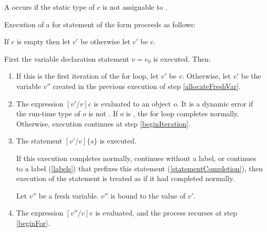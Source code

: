 \documentclass[makeidx]{article}
\begin{document}
{\LMHash{}%
A  occurs if the static type of $c$ is not
assignable to .

\LMHash{}%
Execution of a for statement of the form
 proceeds as follows:

\LMHash{}%
If $c$ is empty then let $c'$ be \TRUE{} otherwise let $c'$ be $c$.

\LMHash{}%
First the variable declaration statement \VAR{} $v = e_0$ is executed.
Then:
\begin{enumerate}
\item
  \label{beginFor}
  If this is the first iteration of the for loop, let $v'$ be $v$.
  Otherwise, let $v'$ be the variable $v''$ created in
  the previous execution of step \ref{allocateFreshVar}.
\item
  The expression $[v'/v]c$ is evaluated to an object $o$.
  It is a dynamic error if the run-time type of $o$ is not .
  If $o$ is \FALSE, the for loop completes normally.
  Otherwise, execution continues at step \ref{beginIteration}.
\item
  \label{beginIteration}
  The statement $[v'/v]\{s\}$ is executed.

  If this execution completes normally, continues without a label,
  or continues to a label (\ref{labels})
  that prefixes this \FOR{} statement (\ref{statementCompletion}),
  then execution of the statement is treated as if it had completed normally.

  \label{allocateFreshVar}
  Let $v''$ be a fresh variable.
  $v''$ is bound to the value of $v'$.
\item
  The expression $[v''/v]e$ is evaluated, and
  the process recurses at step \ref{beginFor}.
\end{enumerate}



}
\end{document}
